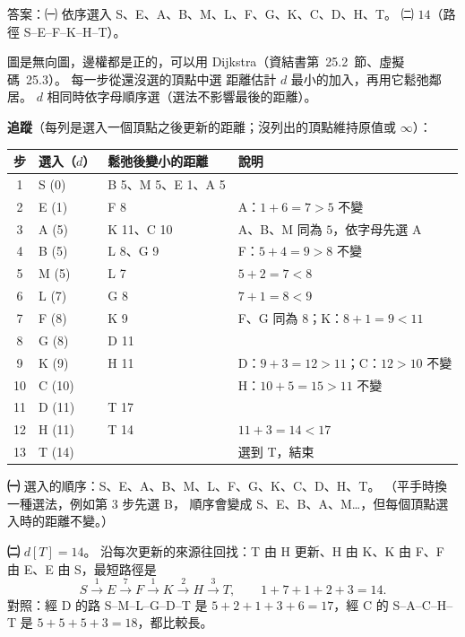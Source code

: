 \begin{pastsoln}
答案：㈠ 依序選入 S、E、A、B、M、L、F、G、K、C、D、H、T。 ㈡ $14$（路徑 S--E--F--K--H--T）。

圖是無向圖，邊權都是正的，可以用 Dijkstra（資結書第~25.2~節、虛擬碼~25.3）。 每一步從還沒選的頂點中選
距離估計 $d$ 最小的加入，再用它鬆弛鄰居。 $d$ 相同時依字母順序選（選法不影響最後的距離）。

\textbf{追蹤}（每列是選入一個頂點之後更新的距離；沒列出的頂點維持原值或 $\infty$）：
\begin{center}
\small
\begin{tabular}{clll}
\toprule
步 & 選入（$d$） & 鬆弛後變小的距離 & 說明 \\
\midrule
1 & S (0) & B 5、M 5、E 1、A 5 & \\
2 & E (1) & F 8 & A：$1 + 6 = 7 > 5$ 不變 \\
3 & A (5) & K 11、C 10 & A、B、M 同為 $5$，依字母先選 A \\
4 & B (5) & L 8、G 9 & F：$5 + 4 = 9 > 8$ 不變 \\
5 & M (5) & L 7 & $5 + 2 = 7 < 8$ \\
6 & L (7) & G 8 & $7 + 1 = 8 < 9$ \\
7 & F (8) & K 9 & F、G 同為 $8$；K：$8 + 1 = 9 < 11$ \\
8 & G (8) & D 11 & \\
9 & K (9) & H 11 & D：$9 + 3 = 12 > 11$；C：$12 > 10$ 不變 \\
10 & C (10) & & H：$10 + 5 = 15 > 11$ 不變 \\
11 & D (11) & T 17 & \\
12 & H (11) & T 14 & $11 + 3 = 14 < 17$ \\
13 & T (14) & & 選到 T，結束 \\
\bottomrule
\end{tabular}
\end{center}

\textbf{㈠} 選入的順序：S、E、A、B、M、L、F、G、K、C、D、H、T。 （平手時換一種選法，例如第 3 步先選 B，
順序會變成 S、E、B、A、M…，但每個頂點選入時的距離不變。）

\textbf{㈡} $d[T] = 14$。 沿每次更新的來源往回找：T 由 H 更新、H 由 K、K 由 F、F 由 E、E 由 S，最短路徑是
\[
S \xrightarrow{1} E \xrightarrow{7} F \xrightarrow{1} K \xrightarrow{2} H \xrightarrow{3} T,\qquad 1 + 7 + 1 + 2 + 3 = 14.
\]
對照：經 D 的路 S--M--L--G--D--T 是 $5 + 2 + 1 + 3 + 6 = 17$，經 C 的 S--A--C--H--T 是 $5 + 5 + 5 + 3 = 18$，都比較長。
\end{pastsoln}
